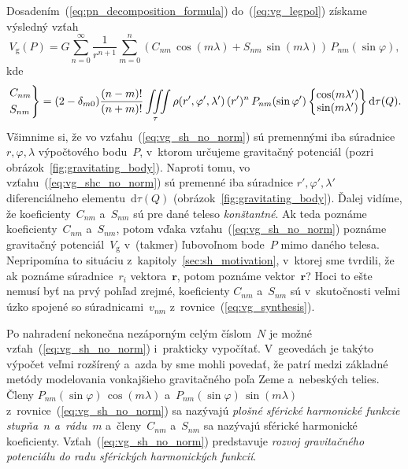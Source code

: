 \documentclass[a4paper, 12pt]{book}
\newcommand{\diff}{\mathrm d}
\newcommand{\gidx}{\mathrm g}
\let\vec\mathbf
\begin{document}
Dosadením~(\ref{eq:pn_decomposition_formula}) do~(\ref{eq:vg_legpol})
získame výsledný vzťah
%
\begin{equation}
\label{eq:vg_sh_no_norm}
V_\gidx(P) = G \sum_{n = 0}^\infty \frac{1}{r^{n + 1}} \sum_{m = 0}^{n} \left(
C_{nm} \, \cos(m\lambda) + S_{nm} \, \sin(m\lambda)\right) \,
P_{nm}(\sin\varphi){,}
\end{equation}
%
kde
%
\begin{equation}
\label{eq:vg_shc_no_norm}
\begin{rcases}
C_{nm}\\
S_{nm}
\end{rcases}
= (2 - \delta_{m0}) \frac{(n - m)!}{(n + m)!} \iiint\limits_{\tau} \rho(r',
\varphi', \lambda') \, (r')^n \, P_{nm}(\sin\varphi')
%
\begin{Bmatrix}
\cos(m\lambda')\\
\sin(m\lambda')
\end{Bmatrix}
%
\diff\tau(Q){.}
\end{equation}
%
Všimnime si, že vo vzťahu~(\ref{eq:vg_sh_no_norm}) sú premennými iba súradnice 
$r, \varphi, \lambda$ výpočtového bodu~$P$, v~ktorom určujeme gravitačný 
potenciál (pozri obrázok~\ref{fig:gravitating_body}).  Naproti tomu, vo 
vzťahu~(\ref{eq:vg_shc_no_norm}) sú premenné iba súradnice $r',\varphi', 
\lambda'$ diferenciálneho elementu~$\diff\tau(Q)$ 
(obrázok~\ref{fig:gravitating_body}).  Ďalej vidíme, že koeficienty~$C_{nm}$ 
a~$S_{nm}$ sú pre dané teleso \emph{konštantné}.  Ak teda poznáme 
koeficienty~$C_{nm}$ a~$S_{nm}$, potom vďaka vzťahu~(\ref{eq:vg_sh_no_norm}) 
poznáme gravitačný potenciál~$V_\gidx$ v~(takmer) ľubovoľnom bode~$P$ mimo 
daného telesa.  Nepripomína to situáciu z~kapitoly~\ref{sec:sh_motivation}, 
v~ktorej sme tvrdili, že ak poznáme súradnice~$r_i$ vektora~$\vec r$, potom 
poznáme vektor~$\vec r$?  Hoci to ešte nemusí byť na prvý pohľad zrejmé, 
koeficienty $C_{nm}$ a~$S_{nm}$ sú v~skutočnosti veľmi úzko spojené so 
súradnicami~$v_{nm}$ z~rovnice~(\ref{eq:vg_synthesis}).

Po nahradení nekonečna nezáporným celým číslom~$N$ je možné 
vzťah~(\ref{eq:vg_sh_no_norm}) i~prakticky vypočítať.  V~geovedách je takýto
výpočet veľmi rozšírený a~azda by sme mohli povedať, že patrí medzi základné  
metódy modelovania vonkajšieho
gravitačného poľa Zeme a~nebeských telies.  Členy $P_{nm}(\sin\varphi) \,
\cos(m\lambda)$ a~$ P_{nm}(\sin\varphi) \, \sin(m\lambda)$
z~rovnice~(\ref{eq:vg_sh_no_norm}) sa nazývajú \emph{plošné sférické harmonické
funkcie stupňa~$n$ a~rádu~$m$} a~členy~$C_{nm}$ a~$S_{nm}$ sa nazývajú sférické
harmonické koeficienty.  Vzťah~(\ref{eq:vg_sh_no_norm}) predstavuje
\emph{rozvoj gravitačného potenciálu do radu sférických harmonických funkcií}.
\end{document}

